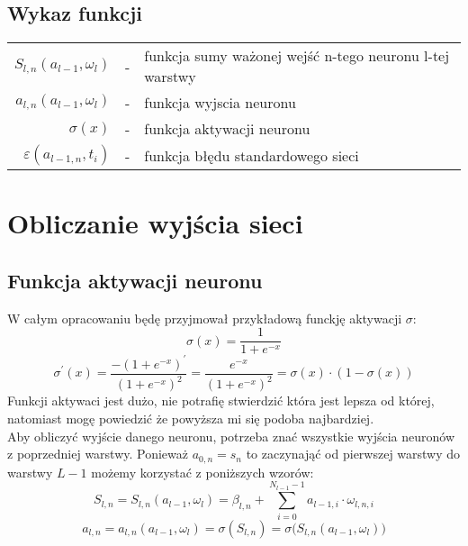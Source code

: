 \documentclass[]{article}
\begin{document}
	\subsection{Wykaz funkcji}
		\begin{tabular}{rcl}
			$ S_{l,n}\left( a_{l-1}, \omega_{l} \right) $ &-& funkcja sumy ważonej wejść n-tego neuronu l-tej warstwy \\
			$ a_{l,n}\left( a_{l-1}, \omega_{l} \right) $ &-& funkcja wyjscia neuronu \\
			$ \sigma\left(x\right) $ &-& funkcja aktywacji neuronu \\
			$ \varepsilon \left( a_{l-1,n}, t_{i} \right) $ &-& funkcja błędu standardowego sieci \\
		\end{tabular}

\newpage
\section{Obliczanie wyjścia sieci}
	\subsection{Funkcja aktywacji neuronu}
		W całym opracowaniu będę przyjmował przykładową funckję aktywacji $\sigma$:
		\begin{equation}\label{eq:activation:1}
			\sigma\left(x\right) = \frac{1}{ 1 + e^{-x} }
		\end{equation}
		\begin{equation}\label{eq:activationderivative:1}
		\sigma^{\prime}\left(x\right) = \frac{ -\left( 1 + e^{-x} \right)^{\prime} }{ \left( 1 + e^{-x} \right)^{2} } =
		\frac{ e^{-x} }{ \left( 1 + e^{-x} \right)^{2} } = \sigma\left(x\right) \cdot \left( 1 - \sigma\left(x\right) \right)
		\end{equation}
		Funkcji aktywaci jest dużo, nie potrafię stwierdzić która jest lepsza od której, natomiast mogę powiedzić że powyższa mi się podoba najbardziej. \\
		Aby obliczyć wyjście danego neuronu, potrzeba znać wszystkie wyjścia neuronów z poprzedniej warstwy. Ponieważ $ a_{0,n} = s_{n} $ to zaczynająć od pierwszej warstwy do warstwy $L-1$ możemy korzystać z poniższych wzorów:
		\begin{equation} \label{eq:neuroninputsum:1}
			S_{l,n} = S_{l,n}\left( a_{l-1}, \omega_{l} \right) = \beta_{l,n} + \sum_{i=0}^{ N_{l-1}-1 } a_{l-1,i} \cdot \omega_{l,n,i}
		\end{equation}
		\begin{equation} \label{eq:activation:2}
			a_{l,n} = a_{l,n}\left( a_{l-1}, \omega_{l} \right) = \sigma\left( S_{l,n} \right) = \sigma \big( S_{l,n}\left( a_{l-1}, \omega_{l} \right) \big)
		\end{equation}
\end{document}
